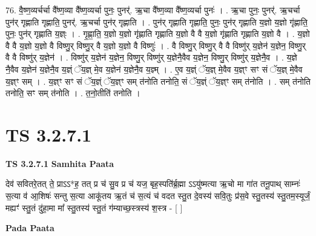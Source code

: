 \documentclass[17pt]{extarticle}
\begin{document}
76. वै॒ष्ण॒व्यर्चर्चा वै᳚ष्ण॒व्या वै᳚ष्ण॒व्यर्चा पुनः॒ पुनर्॑. ऋ॒चा वै᳚ष्ण॒व्या वै᳚ष्ण॒व्यर्चा पुनः॑ । . ऋ॒चा पुनः॒ पुनर्॑. ऋ॒चर्चा पुन॑र् गृह्णाति गृह्णाति॒ पुनर्॑. ऋ॒चर्चा पुन॑र् गृह्णाति । . पुन॑र् गृह्णाति गृह्णाति॒ पुनः॒ पुन॑र् गृह्णाति य॒ज्ञो य॒ज्ञो गृ॑ह्णाति॒ पुनः॒ पुन॑र् गृह्णाति य॒ज्ञ्ः । . गृ॒ह्णा॒ति॒ य॒ज्ञो य॒ज्ञो गृ॑ह्णाति गृह्णाति य॒ज्ञो वै वै य॒ज्ञो गृ॑ह्णाति गृह्णाति य॒ज्ञो वै । . य॒ज्ञो वै वै य॒ज्ञो य॒ज्ञो वै विष्णु॒र् विष्णु॒र् वै य॒ज्ञो य॒ज्ञो वै विष्णुः॑ । . वै विष्णु॒र् विष्णु॒र् वै वै विष्णु॑र् य॒ज्ञेन॑ य॒ज्ञेन॒ विष्णु॒र् वै वै विष्णु॑र् य॒ज्ञेन॑ । . विष्णु॑र् य॒ज्ञेन॑ य॒ज्ञेन॒ विष्णु॒र् विष्णु॑र् य॒ज्ञेनै॒वैव य॒ज्ञेन॒ विष्णु॒र् विष्णु॑र् य॒ज्ञेनै॒व । . य॒ज्ञे नै॒वैव य॒ज्ञेन॑ य॒ज्ञेनै॒व य॒ज्ञ्ं ॅय॒ज्ञ् मे॒व य॒ज्ञेन॑ य॒ज्ञेनै॒व य॒ज्ञ्म् । . ए॒व य॒ज्ञ्ं ॅय॒ज्ञ् मे॒वैव य॒ज्ञ्ꣳ सꣳ सं ॅय॒ज्ञ् मे॒वैव य॒ज्ञ्ꣳ सम् । . य॒ज्ञ्ꣳ सꣳ सं ॅय॒ज्ञ्ं ॅय॒ज्ञ्ꣳ सम् त॑नोति तनोति॒ सं ॅय॒ज्ञ्ं ॅय॒ज्ञ्ꣳ सम् त॑नोति । . सम् त॑नोति तनोति॒ सꣳ सम् त॑नोति । . त॒नो॒तीति॑ तनोति । \newline
\pagebreak
{}

\section{ TS 3.2.7.1 }

\textbf{TS 3.2.7.1 } \newline
\textbf{Samhita Paata} \newline

देव॑ सवितरे॒तत् ते॒ प्राऽऽ*ह॒ तत् प्र च॑ सु॒व प्र च॑ यज॒ बृह॒स्पति॑र्ब्र॒ह्मा ऽऽयु॑ष्मत्या ऋ॒चो मा गा॑त तनू॒पाथ् साम्नः॑ स॒त्या व॑ आ॒शिषः॑ सन्तु स॒त्या आकू॑तय ऋ॒तं च॑ स॒त्यं च॑ वदत स्तु॒त दे॒वस्य॑ सवि॒तुः प्र॑स॒वे स्तु॒तस्य॑ स्तु॒तम॒स्यूर्जं॒ मह्यꣳ॑ स्तु॒तं दु॑हा॒मा मा᳚ स्तु॒तस्य॑ स्तु॒तं ग॑म्याच्छ॒स्त्रस्य॑ श॒स्त्र - [  ] \newline

\textbf{Pada Paata} \newline
\end{document}
